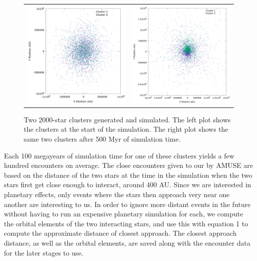 \documentclass[12pt]{article}
\begin{document}
    \begin{figure}[H]
        \centering
        \caption{Two 2000-star clusters generated and simulated. The left plot
            shows the clusters at the start of the simulation. The right plot shows
            the same two clusters after 500 Myr of simulation time.}
        \begin{tabular}{cc}
            \includegraphics[width=3.0in]{clusters_superimposed_n_2000} &
            \includegraphics[width=3.0in]{clusters_superimposed_final_n_2000}
        \end{tabular}
    \end{figure}

    Each 100 megayears of simulation time for one of these clusters yields a
    few hundred encounters on average. The close encounters given to our by 
    AMUSE are based on the distance of the two stars at the time in the simulation
    when the two stars first get close enough to interact, around 400 AU.
    Since we are interested in planetary effects, only events where the stars
    then approach very near one another are interesting to us. In order to
    ignore more distant events in the future without having to run an expensive 
    planetary simulation for each, we compute the orbital elements of the two
    interacting stars, and use this with equation 1 to compute the approximate
    distance of closest approach. The closest approach distance, as well as 
    the orbital elements, are saved along with the encounter data for the later
    stages to use.
\end{document}
